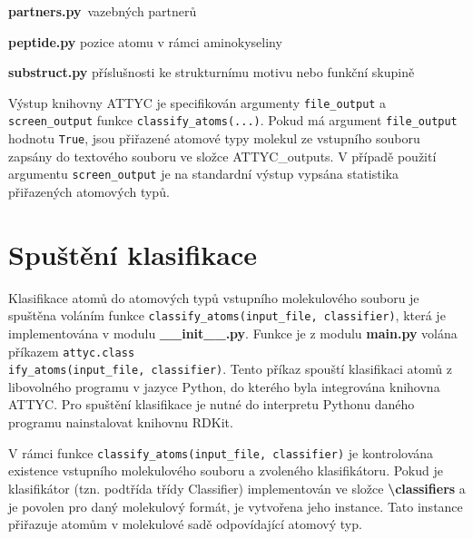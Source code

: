 \vspace{0.01cm}
\textbf{partners.py}\ vazebných partnerů

\vspace{0.01cm}
\textbf{peptide.py} pozice atomu v rámci aminokyseliny
    
\vspace{0.01cm}
\textbf{substruct.py} příslušnosti ke strukturnímu motivu nebo funkční skupině

\bigskip
Výstup knihovny ATTYC je specifikován argumenty \verb|file_output| a \verb|screen_output| funkce \verb|classify_atoms(...)|. Pokud má argument \verb|file_output| hodnotu \verb|True|, jsou přiřazené atomové typy molekul ze vstupního souboru zapsány do textového souboru ve složce ATTYC\_outputs. V případě použití argumentu \verb|screen_output| je na standardní výstup vypsána statistika přiřazených atomových typů.


\section{Spuštění klasifikace}
Klasifikace atomů do atomových typů vstupního molekulového souboru je spuštěna voláním fun\-kce \verb|classify_atoms(input_file, classifier)|, která je 
implementována v modulu \textbf{\_\_init\_\_.py}. Funkce je z modulu \textbf{main.py} volána příkazem \verb|attyc.class|\\ \verb|ify_atoms(input_file, classifier)|. Tento příkaz spouští klasifikaci atomů z libovolného programu v jazyce Python, do kterého byla integrována knihovna ATTYC. Pro spuštění klasifikace je nutné do interpretu Pythonu daného programu nainstalovat knihovnu RDKit. 

V rámci funkce \verb|classify_atoms(input_file, classifier)| je kontrolována e\-xistence vstupního molekulového souboru a zvoleného klasifikátoru. Pokud je klasifikátor (tzn. podtřída třídy Classifier) implementován ve složce \textbf{\textbackslash classifiers} a je povolen pro daný molekulový formát, je vytvořena jeho instance. Tato instance přiřazuje atomům v molekulové sadě odpovídající atomový typ.



